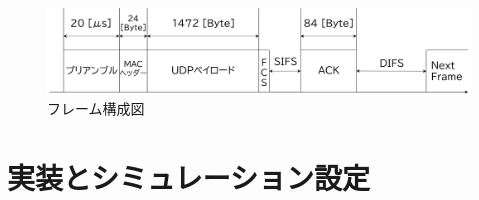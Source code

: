 \documentclass[a4paper, 10pt]{ltjsarticle}
\begin{document}





\begin{figure}[htbp]
  \centering
  \includegraphics[width=1\columnwidth]{./assets/packet.png}
  \caption{フレーム構成図}
  \label{packet}
\end{figure}

\vspace{-2em}

\vspace{-0.5em}

\section{実装とシミュレーション設定}
\end{document}
